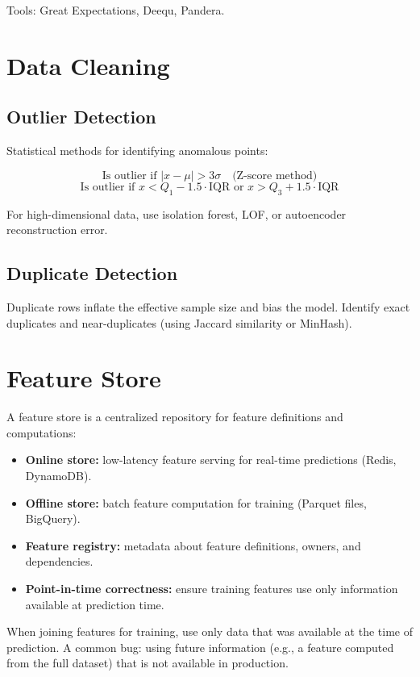Tools: Great Expectations, Deequ, Pandera.

\section{Data Cleaning}

\subsection{Outlier Detection}

Statistical methods for identifying anomalous points:

\[
	\text{Is outlier if } |x - \mu| > 3\sigma \quad \text{(Z-score method)}
\]
\[
	\text{Is outlier if } x < Q_1 - 1.5 \cdot \text{IQR} \text{ or } x > Q_3 + 1.5 \cdot \text{IQR}
\]

For high-dimensional data, use isolation forest, LOF, or autoencoder reconstruction error.

\subsection{Duplicate Detection}

Duplicate rows inflate the effective sample size and bias the model. Identify exact duplicates and near-duplicates (using Jaccard similarity or MinHash).

\section{Feature Store}

A feature store is a centralized repository for feature definitions and computations:

\begin{itemize}
	\item \textbf{Online store:} low-latency feature serving for real-time predictions (Redis, DynamoDB).
	\item \textbf{Offline store:} batch feature computation for training (Parquet files, BigQuery).
	\item \textbf{Feature registry:} metadata about feature definitions, owners, and dependencies.
	\item \textbf{Point-in-time correctness:} ensure training features use only information available at prediction time.
\end{itemize}

\begin{principle}
	When joining features for training, use only data that was available at the time of prediction. A common bug: using future information (e.g., a feature computed from the full dataset) that is not available in production.
\end{principle}

